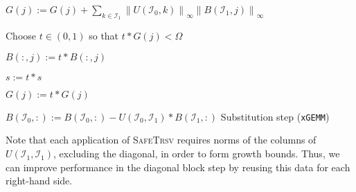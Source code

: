 \documentclass{article}
\begin{document}
\begin{algorithm}[H]
\begin{algorithmic}

    \State \(G(j) := G(j) + \sum_{k\in \mathcal{I}_1} \left\lVert U(\mathcal{I}_0,k) \right\rVert_{\infty} \left\lVert B(\mathcal{I}_1,j) \right\rVert_\infty \)


    \State Choose \(t\in\left(0,1\right)\) so that \(t * G(j) < \Omega\)

    \State \(B(:,j) := t * B(:,j)\)

    \State \(s := t* s\)

    \State \(G(j) := t * G(j)\)    

    \EndIf

    \EndFor

    \State \( B(\mathcal{I}_0,:) := B(\mathcal{I}_0,:) - U(\mathcal{I}_0,\mathcal{I}_1) * B(\mathcal{I}_1,:) \)
    \Comment Substitution step (\texttt{xGEMM})

    \EndFor

    \EndProcedure
  \end{algorithmic}
\end{algorithm}
\noindent
Note that each application of \textsc{SafeTrsv} requires norms of the
columns of \(U(\mathcal{I}_1,\mathcal{I}_1)\), excluding the diagonal,
in order to form growth bounds. Thus, we can improve performance in
the diagonal block step by reusing this data for each right-hand side.
\end{document}
